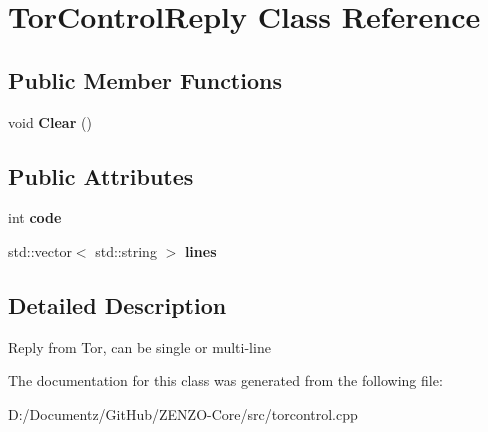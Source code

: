 \hypertarget{class_tor_control_reply}{}\section{Tor\+Control\+Reply Class Reference}
\label{class_tor_control_reply}
\subsection*{Public Member Functions}
\begin{DoxyCompactItemize}
\item 
\mbox{\label{class_tor_control_reply_a94cbd96ffa94322e84ea47daa8ca62bb}} 
void {\bfseries Clear} ()
\end{DoxyCompactItemize}
\subsection*{Public Attributes}
\begin{DoxyCompactItemize}
\item 
\mbox{\label{class_tor_control_reply_aba46f4c0571808c99097edd3246c2f6a}} 
int {\bfseries code}
\item 
\mbox{\label{class_tor_control_reply_ae9c09a2c2d674c1554c91ace852e5269}} 
std\+::vector$<$ std\+::string $>$ {\bfseries lines}
\end{DoxyCompactItemize}


\subsection{Detailed Description}
Reply from Tor, can be single or multi-\/line 

The documentation for this class was generated from the following file\+:\begin{DoxyCompactItemize}
\item 
D\+:/\+Documentz/\+Git\+Hub/\+Z\+E\+N\+Z\+O-\/\+Core/src/torcontrol.\+cpp\end{DoxyCompactItemize}
